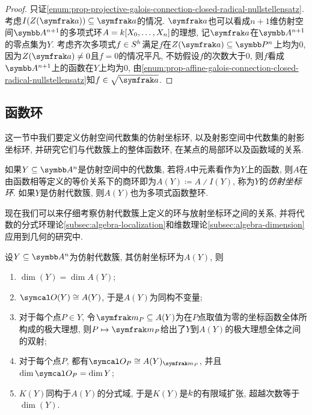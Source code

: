 \begin{proof}
  只证\ref{enum:prop-projective-galois-connection-closed-radical-nullstellensatz}. 考虑$I(Z(\ideal{a}))\subseteq\ideal{a}$的情况. $\ideal{a}$也可以看成$n+1$维仿射空间$\AF^{n+1}$的多项式环$A=k [X_0, \dotsc, X_n]$的理想, 记$\ideal{a}$在$\AF^{n+1}$的零点集为$Y$. 考虑齐次多项式$f\in S^h$满足$f$在$Z(\ideal{a})\subseteq \PP^n$上均为0, 因为$Z(\ideal{a})\neq 0$且$f=0$的情况平凡, 不妨假设$f$的次数大于0, 则$f$看成$\AF^{n+1}$上的函数在$Y$上均为0, 由\ref{enum:prop-affine-galois-connection-closed-radical-nullstellensatz}知$f\in\sqrt{\ideal{a}}$.
\end{proof}

\subsection{函数环}\label{subsec:geometry-functionrings}

这一节中我们要定义仿射空间代数集的仿射坐标环, 以及射影空间中代数集的射影坐标环, 并研究它们与代数簇上的整体函数环, 在某点的局部环以及函数域的关系.

如果$Y\subseteq \AF^n$是仿射空间中的代数集, 若将$A$中元素看作为$Y$上的函数, 则$A$在由函数相等定义的等价关系下的商环即为$A(Y)\coloneq A{\divslash}I(Y)$, 称为$Y$的\emph{仿射坐标环}. 如果$Y$是仿射代数簇, 则$A(Y)$也为多项式函数整环.

现在我们可以来仔细考察仿射代数簇上定义的环与放射坐标环之间的关系, 并将代数的分式环理论\ref{subsec:algebra-localization}和维数理论\ref{subsec:algebra-dimension}应用到几何的研究中.

\begin{theorem}\label{thm:affinerings}
  设$Y\subseteq \AF^n$为仿射代数簇, 其仿射坐标环为$A(Y)$, 则
  \begin{enumerate}
    \item\label{enum:thm-affine-rings-1} $\dim (Y)=\dim A(Y)$;
    \item\label{enum:thm-affine-rings-2} $\OO (Y)\cong A(Y)$, 于是$A(Y)$为同构不变量;
    \item\label{enum:thm-affine-rings-3} 对于每个点$P\in Y$, 令$\ideal{m}_P\subseteq A(Y)$为在$P$点取值为零的坐标函数全体所构成的极大理想, 则$P\mapsto \ideal{m}_P$给出了$Y$到$A(Y)$的极大理想全体之间的双射;
    \item\label{enum:thm-affine-rings-4} 对于每个点$P$, 都有$\OO_P\cong A(Y)_{\ideal{m}_P}$, 并且$\dim \OO_P=\dim Y$;
    \item\label{enum:thm-affine-rings-5} $K(Y)$同构于$A(Y)$的分式域, 于是$K(Y)$是$k$的有限域扩张, 超越次数等于$\dim (Y)$.
  \end{enumerate}
\end{theorem}

